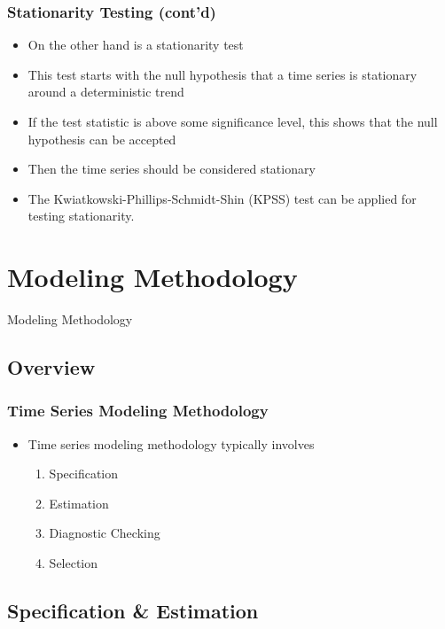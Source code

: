\documentclass[presentation]{beamer}
\begin{document}
\begin{frame}[t]
\frametitle{Stationarity Testing (cont'd)}
\footnotesize{
\begin{itemize}
\item{On the other hand is a stationarity test}
\item{This test starts with the null hypothesis that a time series is stationary around a deterministic trend}
\item{If the test statistic is above some significance level, this shows that the null hypothesis can be accepted}
\item{Then the time series should be considered stationary}
\item{The Kwiatkowski-Phillips-Schmidt-Shin (KPSS) test can be applied for testing stationarity.}
\end{itemize}
}
\end{frame}

\section{Modeling Methodology}

\begin{frame}
\begin{center}
\Large{Modeling Methodology}
\end{center}
\end{frame}

\subsection{Overview}

\begin{frame}[t]
\frametitle{Time Series Modeling Methodology}
\begin{itemize}
\item{Time series modeling methodology typically involves
  \begin{enumerate}
  \item{Specification}
  \item{Estimation}
  \item{Diagnostic Checking}
  \item{Selection}
  \end{enumerate}}
\end{itemize}
\end{frame}

\subsection{Specification \& Estimation}
\end{document}
